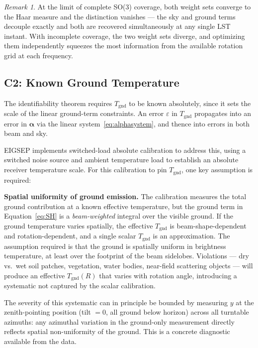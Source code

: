 \documentclass{aastex631}
\newcommand{\Tgnd}{T_\mathrm{gnd}}
\theoremstyle{plain}
\theoremstyle{remark}
\newtheorem{remark}{Remark}
\begin{document}
\begin{remark}
At the limit of complete SO(3) coverage, both weight sets converge
to the Haar measure and the distinction vanishes --- the sky and
ground terms decouple exactly and both are recovered simultaneously
at any single LST instant.
With incomplete coverage, the two weight sets diverge, and
optimizing them independently squeezes the most information
from the available rotation grid at each frequency.
\end{remark}

\subsection{C2: Known Ground Temperature}
\label{sec:tgnd}

The identifiability theorem requires $\Tgnd$ to be known absolutely,
since it sets the scale of the linear ground-term constraints.
An error $\varepsilon$ in $\Tgnd$ propagates into an error in
$\boldsymbol{\alpha}$ via the linear system~\ref{eq:alphasystem}, and
thence into errors in both beam and sky.

EIGSEP implements switched-load absolute calibration to address this, using a
switched noise source and ambient temperature load to establish an
absolute receiver temperature scale.
For this calibration to pin $\Tgnd$, one key assumption is required:

\textbf{Spatial uniformity of ground emission.}
The calibration measures the total ground contribution at a known
effective temperature, but the ground term in Equation~\ref{eq:SH}
is a \emph{beam-weighted} integral over the visible ground.
If the ground temperature varies spatially, the effective $\Tgnd$ is
beam-shape-dependent and rotation-dependent, and a single scalar
$\Tgnd$ is an approximation.
The assumption required is that the ground is spatially uniform in
brightness temperature, at least over the footprint of the beam
sidelobes.
Violations --- dry vs.\ wet soil patches, vegetation, water bodies,
near-field scattering objects --- will produce an effective
$\Tgnd(R)$ that varies with rotation angle, introducing a systematic
not captured by the scalar calibration.

The severity of this systematic can in principle be bounded by
measuring $y$ at the zenith-pointing position (tilt $= 0$, all ground
below horizon) across all turntable azimuths: any azimuthal variation
in the ground-only measurement directly reflects spatial
non-uniformity of the ground.
This is a concrete diagnostic available from the data.
\end{document}

